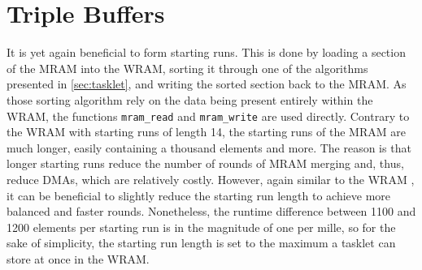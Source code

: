 \section{Triple Buffers}
\label{sec:mram:triple}

It is yet again beneficial to form starting runs.
This is done by loading a section of the MRAM into the WRAM, sorting it through one of the algorithms presented in \cref{sec:tasklet}, and writing the sorted section back to the MRAM.
As those sorting algorithm rely on the data being present entirely within the WRAM, the functions \lstinline|mram_read| and \lstinline|mram_write| are used directly.
Contrary to the WRAM \MS*{} with starting runs of length 14, the starting runs of the MRAM \MS{} are much longer, easily containing a thousand elements and more.
The reason is that longer starting runs reduce the number of rounds of MRAM merging and, thus, reduce DMAs, which are relatively costly.
However, again similar to the WRAM \MS*{}, it can be beneficial to slightly reduce the starting run length to achieve more balanced and faster rounds.
Nonetheless, the runtime difference between 1100 and 1200 elements per starting run is in the magnitude of one per mille, so for the sake of simplicity, the starting run length is set to the maximum a tasklet can store at once in the WRAM.


